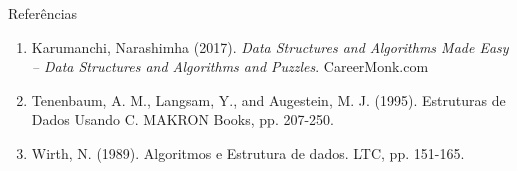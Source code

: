 




\begin{frame}{Referências}
	\begin{enumerate}
	\item Karumanchi, Narashimha (2017). 
	\textit{Data Structures and Algorithms Made Easy -- Data Structures and Algorithms
		and Puzzles}.  CareerMonk.com

\item Tenenbaum, A. M., Langsam, Y., and Augestein, M. J. (1995). Estruturas de Dados Usando C. MAKRON Books, pp. 207-250.
\item Wirth, N. (1989). Algoritmos e Estrutura de dados. LTC, pp. 151-165.
	\end{enumerate}
\end{frame}
